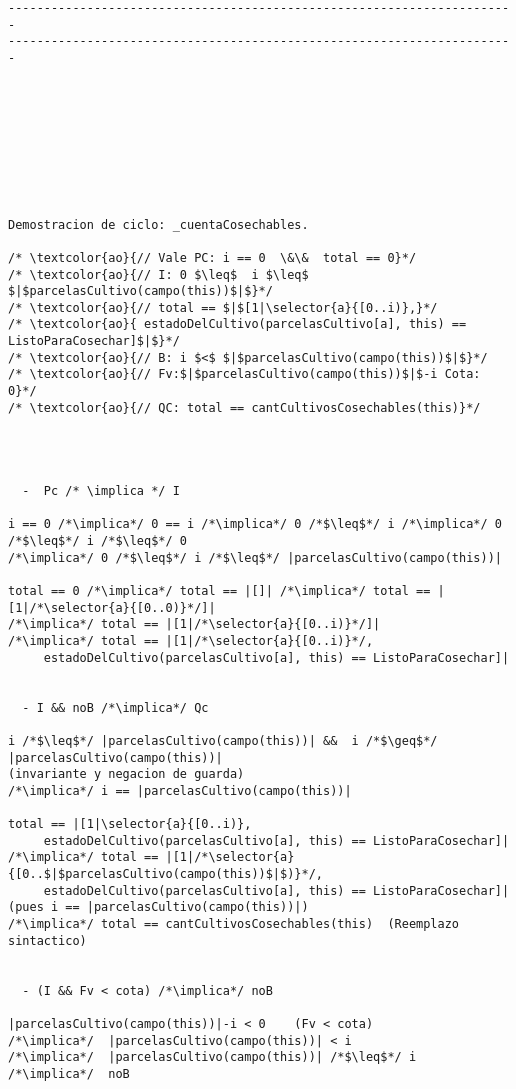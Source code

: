 \begin{lstlisting}
-----------------------------------------------------------------------
-----------------------------------------------------------------------









Demostracion de ciclo: _cuentaCosechables.

/* \textcolor{ao}{// Vale PC: i == 0  \&\&  total == 0}*/
/* \textcolor{ao}{// I: 0 $\leq$  i $\leq$ $|$parcelasCultivo(campo(this))$|$}*/
/* \textcolor{ao}{// total == $|$[1|\selector{a}{[0..i)},}*/
/* \textcolor{ao}{ estadoDelCultivo(parcelasCultivo[a], this) == ListoParaCosechar]$|$}*/
/* \textcolor{ao}{// B: i $<$ $|$parcelasCultivo(campo(this))$|$}*/
/* \textcolor{ao}{// Fv:$|$parcelasCultivo(campo(this))$|$-i Cota: 0}*/
/* \textcolor{ao}{// QC: total == cantCultivosCosechables(this)}*/    




  -  Pc /* \implica */ I
  
i == 0 /*\implica*/ 0 == i /*\implica*/ 0 /*$\leq$*/ i /*\implica*/ 0 /*$\leq$*/ i /*$\leq$*/ 0 
/*\implica*/ 0 /*$\leq$*/ i /*$\leq$*/ |parcelasCultivo(campo(this))|

total == 0 /*\implica*/ total == |[]| /*\implica*/ total == |[1|/*\selector{a}{[0..0)}*/]|
/*\implica*/ total == |[1|/*\selector{a}{[0..i)}*/]| 
/*\implica*/ total == |[1|/*\selector{a}{[0..i)}*/, 
     estadoDelCultivo(parcelasCultivo[a], this) == ListoParaCosechar]|


  - I && noB /*\implica*/ Qc
  
i /*$\leq$*/ |parcelasCultivo(campo(this))| &&  i /*$\geq$*/ |parcelasCultivo(campo(this))| 
(invariante y negacion de guarda)
/*\implica*/ i == |parcelasCultivo(campo(this))|

total == |[1|\selector{a}{[0..i)}, 
     estadoDelCultivo(parcelasCultivo[a], this) == ListoParaCosechar]|
/*\implica*/ total == |[1|/*\selector{a}{[0..$|$parcelasCultivo(campo(this))$|$)}*/,
     estadoDelCultivo(parcelasCultivo[a], this) == ListoParaCosechar]|
(pues i == |parcelasCultivo(campo(this))|)
/*\implica*/ total == cantCultivosCosechables(this)  (Reemplazo sintactico)


  - (I && Fv < cota) /*\implica*/ noB

|parcelasCultivo(campo(this))|-i < 0    (Fv < cota)
/*\implica*/  |parcelasCultivo(campo(this))| < i    
/*\implica*/  |parcelasCultivo(campo(this))| /*$\leq$*/ i
/*\implica*/  noB



\end{lstlisting}
